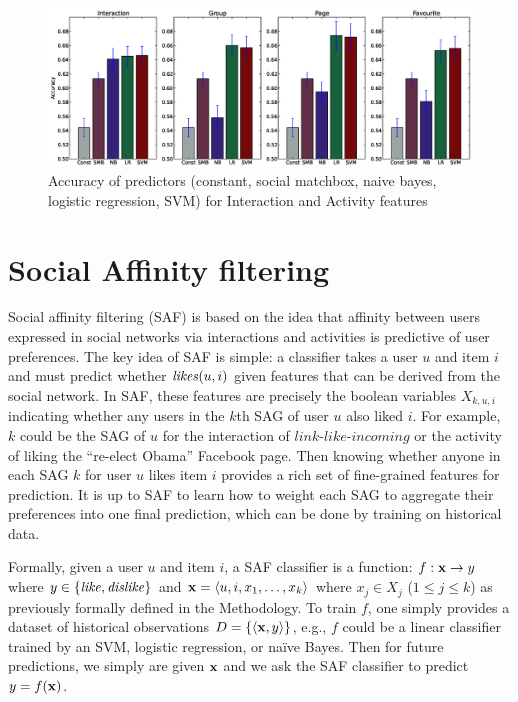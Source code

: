 \begin{figure}[tbp!]
\hspace{-8mm}\includegraphics[width=230mm]{data/plots/accuracy/accuracy.eps}
\caption{ Accuracy of predictors (constant, social matchbox, naive bayes, logistic regression, SVM) for Interaction and Activity  features }
\label{Fig1}
\end{figure}

\section{Social Affinity filtering}

Social affinity filtering (SAF) is based on the idea that affinity
between users expressed in social networks via interactions and
activities is predictive of user preferences.  The key idea of SAF is
simple: a classifier takes a user $u$ and item $i$ and must predict
whether $\likes(u,i)$ given features that can be derived from the
social network.  In SAF, these features are precisely the boolean
variables $X_{k,u,i}$ indicating whether any users in the $k$th SAG of
user $u$ also liked $i$.  For example, $k$ could be the SAG of $u$ for
the interaction of $\textit{link-like-incoming}$ or the activity of
liking the ``re-elect Obama'' Facebook page.  Then knowing whether
anyone in each SAG $k$ for user $u$ likes item $i$ provides a rich set
of fine-grained features for prediction.  It is up to SAF to learn how
to weight each SAG to aggregate their preferences into one final
prediction, which can be done by training on historical data.

Formally, given a user $u$ and item $i$, a SAF classifier is a
function: $f: \x \to y$ where $y \in \{ \like, \dislike \}$ and $\x =
\langle u,i,x_1,\ldots,x_k \rangle$ where $x_j \in X_j$ ($1 \leq j
\leq k$) as previously formally defined in the Methodology.  To train $f$, one
simply provides a dataset of historical observations $D = \{ \langle
\x,y \rangle \}$, e.g., $f$ could be a linear classifier trained by an
SVM, logistic regression, or na\"{i}ve Bayes.  Then for future
predictions, we simply are given $\x$ and we ask the SAF classifier to
predict $y = f(\x)$.

